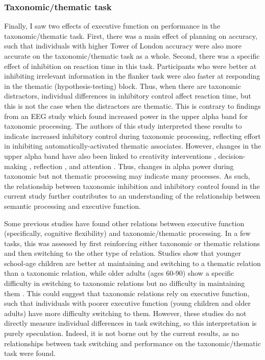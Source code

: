 \documentclass[../dissertation.tex]{subfiles}
\begin{document}
\subsubsection{Taxonomic/thematic task}
	Finally, I saw two effects of executive function on performance in the taxonomic/thematic task. First, there was a main effect of planning on accuracy, such that individuals with higher Tower of London accuracy were also more accurate on the taxonomic/thematic task as a whole. Second, there was a specific effect of inhibition on reaction time in this task. Participants who were better at inhibiting irrelevant information in the flanker task were also faster at responding in the thematic (hypothesis-testing) block. Thus, when there are taxonomic distractors, individual differences in inhibitory control affect reaction time, but this is not the case when the distractors are thematic. This is contrary to findings from an EEG study which found increased power in the upper alpha band \citep{Maguire2010} for taxonomic processing. The authors of this study interpreted these results to indicate increased inhibitory control during taxonomic processing, reflecting effort in inhibiting automatically-activated thematic associates. However, changes in the upper alpha band have also been linked to creativity interventions \citep{Fink2011}, decision-making \citep{Fink2018}, reflection \citep{Rominger2017}, and attention \citep{VanderLubbe2019}. Thus, changes in alpha power during taxonomic but not thematic processing may indicate many processes. As such, the relationship between taxonomic inhibition and inhibitory control found in the current study further contributes to an understanding of the relationship between semantic processing and executive function. \par
	Some previous studies have found other relations between executive function (specifically, cognitive flexibility) and taxonomic/thematic processing. In a few tasks, this was assessed by first reinforcing either taxonomic or thematic relations and then switching to the other type of relation. Studies show that younger school-age children are better at maintaining and switching to a thematic relation than a taxonomic relation, while older adults (ages 60-90) show a specific difficulty in switching to taxonomic relations but no difficulty in maintaining them \citep{Blaye2007, Maintenant2011}. This could suggest that taxonomic relations rely on executive function, such that individuals with poorer executive function (young children and older adults) have more difficulty switching to them. However, these studies do not directly measure individual differences in task switching, so this interpretation is purely speculation. Indeed, it is not borne out by the current results, as no relationships between task switching and performance on the taxonomic/thematic task were found. \par 
\end{document}
